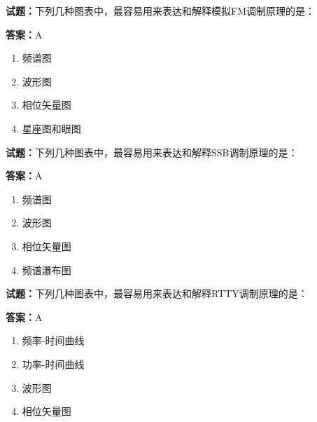 \documentclass{ctexbook}
\begin{document}




\vspace{1em}

\textbf{试题：}下列几种图表中，最容易用来表达和解释模拟FM调制原理的是： 

\textbf{答案：}A 

\begin{enumerate}[leftmargin=3em]
  \item 频谱图 

  \item 波形图 

  \item 相位矢量图 

  \item 星座图和眼图 

\end{enumerate}






\vspace{1em}

\textbf{试题：}下列几种图表中，最容易用来表达和解释SSB调制原理的是： 

\textbf{答案：}A 

\begin{enumerate}[leftmargin=3em]
  \item 频谱图 

  \item 波形图 

  \item 相位矢量图 

  \item 频谱瀑布图 

\end{enumerate}





\vspace{1em}

\textbf{试题：}下列几种图表中，最容易用来表达和解释RTTY调制原理的是： 

\textbf{答案：}A 

\begin{enumerate}[leftmargin=3em]
  \item 频率-时间曲线 

  \item 功率-时间曲线 

  \item 波形图 

  \item 相位矢量图 

\end{enumerate}
\end{document}
